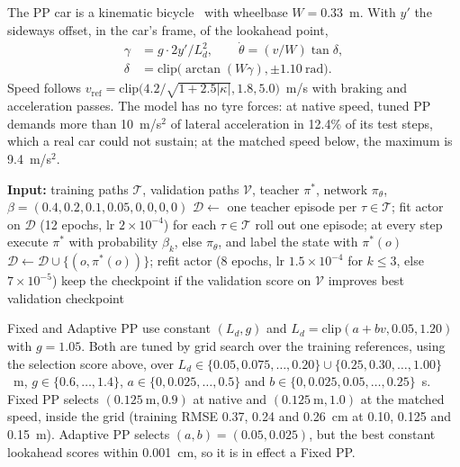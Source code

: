 \documentclass[10pt,twocolumn,twoside]{article}
\newcommand{\Ld}{L_d}
\begin{document}
The PP car is a kinematic bicycle~\cite{rajamani2012} with wheelbase
$W=0.33$~m. With $y'$ the sideways offset, in the car's frame, of the
lookahead point,
\begin{equation}
\begin{aligned}
\gamma &= g\cdot2y'/\Ld^{2}, \qquad \dot\theta=(v/W)\tan\delta,\\
\delta &= \mathrm{clip}\big(\arctan(W\gamma),\pm1.10~\mathrm{rad}\big).
\end{aligned}
\label{eq:pp}
\end{equation}
Speed follows $v_{\mathrm{ref}}=\mathrm{clip}\big(4.2/\sqrt{1+2.5|\kappa|},1.8,5.0\big)$~m/s
with braking and acceleration passes. The model has no tyre forces: at native
speed, tuned PP demands more than 10~m/s$^2$ of lateral acceleration in 12.4\%
of its test steps, which a real car could not sustain; at the matched speed
below, the maximum is 9.4~m/s$^2$.

\begin{algorithm}[t]
\caption{DAgger for the bead (Bead-DAgger).}
\label{alg:dagger}
\small
\begin{algorithmic}[1]
\State \textbf{Input:} training paths $\mathcal{T}$, validation paths
  $\mathcal{V}$, teacher $\pi^{*}$, network $\pi_\theta$,
  $\beta=(0.4,0.2,0.1,0.05,0,0,0,0)$
\State $\mathcal{D}\gets$ one teacher episode per $\tau\in\mathcal{T}$; fit actor
  on $\mathcal{D}$ (12 epochs, lr $2\times10^{-4}$)
  \State for each $\tau\in\mathcal{T}$ roll out one episode; at every step
    execute $\pi^{*}$ with probability $\beta_k$, else $\pi_\theta$, and label
    the state with $\pi^{*}(o)$
  \State $\mathcal{D}\gets\mathcal{D}\cup\{(o,\pi^{*}(o))\}$; refit actor
    (8 epochs, lr $1.5\times10^{-4}$ for $k\le3$, else $7\times10^{-5}$)
  \State keep the checkpoint if the validation score on $\mathcal{V}$ improves
\EndFor
\State \Return best validation checkpoint
\end{algorithmic}
\end{algorithm}

Fixed and Adaptive PP use constant $(\Ld,g)$ and
$\Ld=\mathrm{clip}(a+bv,0.05,1.20)$ with $g=1.05$. Both are tuned by grid search over
the training references, using the selection score above, over
$\Ld\in\{0.05,0.075,\dots,0.20\}\cup\{0.25,0.30,\dots,1.00\}$~m,
$g\in\{0.6,\dots,1.4\}$, $a\in\{0,0.025,\dots,0.5\}$ and
$b\in\{0,0.025,0.05,\dots,0.25\}$~s. Fixed PP selects $(0.125~\mathrm{m},0.9)$
at native and $(0.125~\mathrm{m},1.0)$ at the matched speed, inside the grid
(training RMSE 0.37, 0.24 and 0.26~cm at 0.10, 0.125 and 0.15~m). Adaptive PP
selects $(a,b)=(0.05,0.025)$, but the best constant lookahead scores within
0.001~cm, so it is in effect a Fixed PP.
\end{document}
